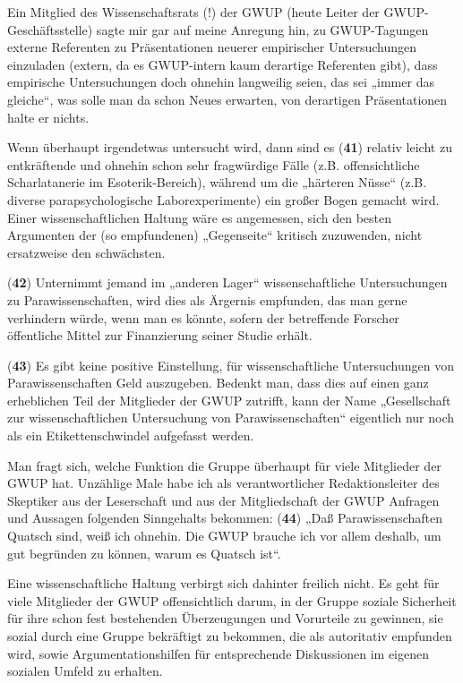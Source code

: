 Ein Mitglied des Wissenschaftsrats (!) der GWUP (heute Leiter der
GWUP-Geschäftsstelle) sagte mir gar auf meine Anregung hin, zu
GWUP-Tagungen externe Referenten zu Präsentationen neuerer empirischer
Untersuchungen einzuladen (extern, da es GWUP-intern kaum derartige
Referenten gibt), dass empirische Untersuchungen doch ohnehin langweilig
seien, das sei „immer das gleiche``, was solle man da schon Neues
erwarten, von derartigen Präsentationen halte er nichts.

Wenn überhaupt irgendetwas untersucht wird, dann sind es (\textbf{41})
relativ leicht zu entkräftende und ohnehin schon sehr fragwürdige Fälle
(z.B. offensichtliche Scharlatanerie im Esoterik-Bereich), während um
die „härteren Nüsse`` (z.B. diverse parapsychologische Laborexperimente)
ein großer Bogen gemacht wird. Einer wissenschaftlichen Haltung wäre es
angemessen, sich den besten Argumenten der (so empfundenen)
„Gegenseite`` kritisch zuzuwenden, nicht ersatzweise den schwächsten.

(\textbf{42}) Unternimmt jemand im „anderen Lager`` wissenschaftliche
Untersuchungen zu Parawissenschaften, wird dies als Ärgernis empfunden,
das man gerne verhindern würde, wenn man es könnte, sofern der
betreffende Forscher öffentliche Mittel zur Finanzierung seiner Studie
erhält.

(\textbf{43}) Es gibt keine positive Einstellung, für wissenschaftliche
Untersuchungen von Parawissenschaften Geld auszugeben. Bedenkt man, dass
dies auf einen ganz erheblichen Teil der Mitglieder der GWUP zutrifft,
kann der Name „Gesellschaft zur wissenschaftlichen Untersuchung von
Parawissenschaften`` eigentlich nur noch als ein Etikettenschwindel
aufgefasst werden.

Man fragt sich, welche Funktion die Gruppe überhaupt für viele
Mitglieder der GWUP hat. Unzählige Male habe ich als verantwortlicher
Redaktionsleiter des Skeptiker aus der Leserschaft und aus der
Mitgliedschaft der GWUP Anfragen und Aussagen folgenden Sinngehalts
bekommen: (\textbf{44}) „Daß Parawissenschaften Quatsch sind, weiß ich
ohnehin. Die GWUP brauche ich vor allem deshalb, um gut begründen zu
können, warum es Quatsch ist``.

Eine wissenschaftliche Haltung verbirgt sich dahinter freilich nicht. Es
geht für viele Mitglieder der GWUP offensichtlich darum, in der Gruppe
soziale Sicherheit für ihre schon fest bestehenden Überzeugungen und
Vorurteile zu gewinnen, sie sozial durch eine Gruppe bekräftigt zu
bekommen, die als autoritativ empfunden wird, sowie Argumentationshilfen
für entsprechende Diskussionen im eigenen sozialen Umfeld zu erhalten.

